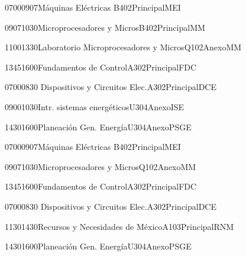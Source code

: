 \documentclass[a4paper,10pt]{report}
\begin{document}
\begin{landscape}
\begin{timetable}
  
  
    {0700}{0907}{Máquinas Eléctricas }{B402}{{\tiny Principal}}{MEI}
   
     {0907}{1030}{Microprocesadores y Micros}{B402}{{\tiny Principal}}{MM}
  
    {1100}{1330}{Laboratorio Microprocesadores y Micros}{Q102}{{\tiny Anexo}}{MM}
  
  
   {1345}{1600}{Fundamentos de Control}{A302}{{\tiny Principal}}{FDC}
  
   
      {0700}{0830}{ Dispositivos y Circuitos Elec.}{A302}{{\tiny Principal}}{DCE}
   
    {0900}{1030}{Intr. sistemas energéticos}{U304}{{\tiny  Anexo}}{ISE}
  
   
  {1430}{1600}{Planeación Gen. Energía}{U304}{{\tiny Anexo}}{PSGE}
 
 
 
   
   
  {0700}{0907}{Máquinas Eléctricas }{B402}{{\tiny Principal}}{MEI}

 {0907}{1030}{Microprocesadores y Micros}{Q102}{{\tiny Anexo}}{MM}

  {1345}{1600}{Fundamentos de Control}{A302}{{\tiny Principal}}{FDC}


 {0700}{0830}{ Dispositivos y Circuitos Elec.}{A302}{{\tiny Principal}}{DCE}

 {1130}{1430}{Recursos y Necesidades de México}{A103}{{\tiny Principal}}{RNM}



 {1430}{1600}{Planeación Gen. Energía}{U304}{{\tiny Anexo}}{PSGE}

  
   
  
  
    
   
 \end{timetable}
 \end{landscape}
 
\end{document}
